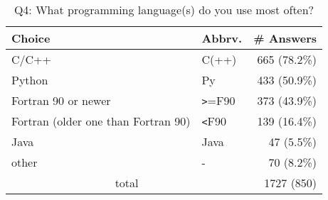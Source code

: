 \begin{table}[htb]%
\begin{center}%
\caption{Q4: What programming language(s) do you use most often?}%
\label{tab:Q4-ans}%
\begin{tabular}{l|l|r}%
\hline%
Choice & Abbrv. & \# Answers \\%
\hline%
C/C++ & C(++) & 665 (78.2\%) \\%
Python & Py & 433 (50.9\%) \\%
Fortran 90 or newer & \verb!>!=F90 & 373 (43.9\%) \\%
Fortran (older one than Fortran 90) & \verb!<!F90 & 139 (16.4\%) \\%
Java & Java & 47 (5.5\%) \\%
other & - & 70 (8.2\%) \\%
\hline%
\multicolumn{2}{c}{total} & 1727 (850)\\%
\hline%
\end{tabular}%
\end{center}%
\end{table}%

